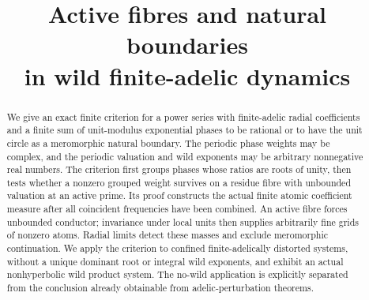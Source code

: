 \documentclass[11pt]{article}
\title{Active fibres and natural boundaries\\in wild finite-adelic dynamics}
\author{}
\date{}
\theoremstyle{definition}
\theoremstyle{remark}
\begin{document}
\maketitle
\begin{abstract}
We give an exact finite criterion for a power series with finite-adelic
radial coefficients and a finite sum of unit-modulus exponential phases
to be rational or to have the unit circle as a meromorphic natural
boundary. The periodic phase weights may be complex, and the periodic
valuation and wild exponents may be arbitrary nonnegative real numbers.
The criterion first groups phases whose ratios are roots of unity, then
tests whether a nonzero grouped weight survives on a residue fibre with
unbounded valuation at an active prime. Its proof constructs the actual
finite atomic coefficient measure after all coincident frequencies have
been combined. An active fibre forces unbounded conductor; invariance
under local units then supplies arbitrarily fine grids of nonzero atoms.
Radial limits detect these masses and exclude meromorphic continuation.
We apply the criterion to confined finite-adelically distorted systems,
without a unique dominant root or integral wild exponents, and exhibit an
actual nonhyperbolic wild product system. The no-wild application is
explicitly separated from the conclusion already obtainable from
adelic-perturbation theorems.
\end{abstract}









\end{document}
